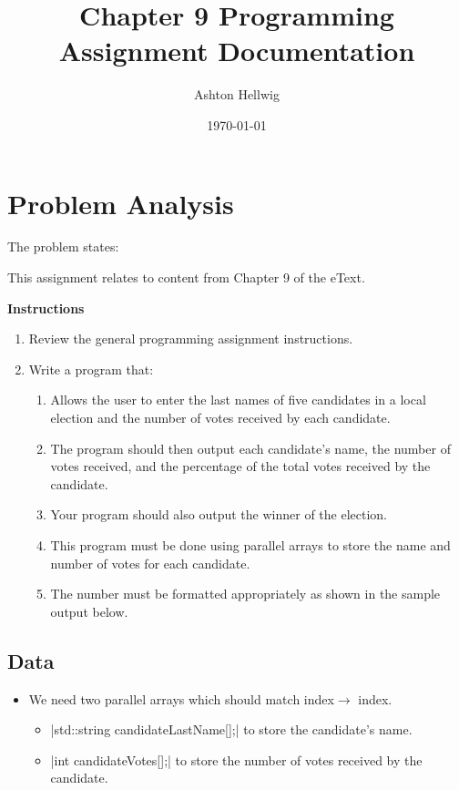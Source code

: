 \documentclass[a4paper, 11pt]{article}
\title{Chapter 9 Programming Assignment Documentation}
\author{Ashton Hellwig}
\date\today
\theoremstyle{definition}
\theoremstyle{plain}
\begin{document}
  \maketitle
  \tableofcontents
  \listofalgorithms
  \lstlistoflistings
  \newpage


  \section{Problem Analysis}
    The problem states:
    \begin{mdframed}[backgroundcolor=green!20]
      This assignment relates to content from Chapter 9 of the eText.

      \textbf{Instructions}\vspace{-8pt}
      \begin{enumerate}
        \item Review the general programming assignment instructions.
        \item Write a program that:
          \begin{enumerate}[label=\Alph*.]
            \item Allows the user to enter the last names of five candidates in
              a local election and the number of votes received by each candidate.
            \item The program should then output each candidate’s name, the
              number of votes received, and the percentage of the total votes
              received by the candidate.
            \item Your program should also output the winner of the election.
            \item This program must be done using parallel arrays to store the
              name and number of votes for each candidate.
            \item The number must be formatted appropriately as shown in the
              sample output below.
          \end{enumerate}
      \end{enumerate}
    \end{mdframed}

    \subsection{Data}
      \begin{itemize}
        \item We need two parallel arrays which should match index$\rightarrow$%
          index.
          \begin{itemize}
            \item |std::string candidateLastName[];| to store the candidate's
              name.
            \item |int candidateVotes[];| to store the number of votes received
              by the candidate.
          \end{itemize}
      \end{itemize}
\end{document}
